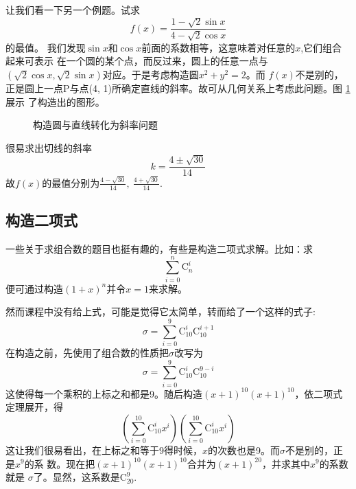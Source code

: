 让我们看一下另一个例题。试求
\[
f(x) = \frac{1-\sqrt{2}\sin{x}}{4-\sqrt{2}\cos{x}}
\]
的最值。
我们发现\(\sin{x}\)和\(\cos{x}\)前面的系数相等，这意味着对任意的$x$,它们组合起来可表示
在一个圆的某个点，而反过来，圆上的任意一点与 \\
\((\sqrt{2}\cos{x}, \sqrt{2}\sin{x})\)对应。于是考虑构造圆\(x^2 + y^2 = 2\)。而
\(f(x)\)不是别的，正是圆上一点P与点(4, 1)所确定直线的斜率。故可从几何关系上考虑此问题。图
\ref{flg:ConstructStraightLine}展示
了构造出的图形。
\begin{figure}[!hbtp]
\begin{center}
\end{center}
\caption{构造圆与直线转化为斜率问题}
\label{flg:ConstructStraightLine}
\end{figure}

很易求出切线的斜率
\[
k = \frac{4 \pm \sqrt{30}}{14}
\]
故\(f(x)\)的最值分别为\(\frac{4 - \sqrt{30}}{14},\ \frac{4 + \sqrt{30}}{14}\).

\subsection{构造二项式}
一些关于求组合数的题目也挺有趣的，有些是构造二项式求解。比如：求
\[
\sum_{i=0}^n{\text{C}_{n}^i}
\]
便可通过构造\((1+x)^n\)并令\(x=1\)来求解。

然而课程中没有给上式，可能是觉得它太简单，转而给了一个这样的式子:
\[
\sigma = \sum_{i=0}^9{\text{C}_{10}^i\text{C}_{10}^{i+1}}
\]
在构造之前，先使用了组合数的性质把$\sigma$改写为
\[
\sigma = \sum_{i=0}^9{\text{C}_{10}^i\text{C}_{10}^{9-i}}
\]
这使得每一个乘积的上标之和都是9。随后构造\((x+1)^{10}(x+1)^{10}\)，依二项式定理展开，得
\[
(\sum_{i=0}^{10}{\text{C}_{10}^ix^i})(\sum_{i=0}^{10}{\text{C}_{10}^ix^i})
\]
这让我们很易看出，在上标之和等于9得时候，$x$的次数也是9。而\(\sigma\)不是别的，正是\(x^9\)的系
数。现在把\((x+1)^{10}(x+1)^{10}\)合并为\((x+1)^{20}\)，并求其中\(x^9\)的系数就是
\(\sigma\)了。显然，这系数是\(\text{C}_{20}^9\).

